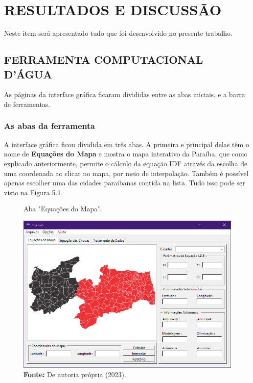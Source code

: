 \chapter{RESULTADOS E DISCUSSÃO}

Neste item será apresentado tudo que foi desenvolvido no presente trabalho.


\section{FERRAMENTA COMPUTACIONAL D'ÁGUA}

As páginas da interface gráfica ficaram divididas entre as abas iniciais, e a barra de ferramentas.

\subsection{As abas da ferramenta}

A interface gráfica ficou dividida em três abas. A primeira e principal delas têm o nome de \textbf{Equações do Mapa} e mostra o mapa interativo da Paraíba, que como explicado anteriormente, permite o cálculo da equação IDF através da escolha de uma coordenada ao clicar no mapa, por meio de interpolação. Também é possível apenas escolher uma das cidades paraibanas contida na lista. Tudo isso pode ser visto na Figura 5.1.\bigskip

\begin{figure}[!ht]
	\centering
	\caption{Aba "Equações do Mapa".}
	\includegraphics[width=.7625\linewidth]{figuras/equacoes_do_mapa.png}
	\caption*{\textbf{Fonte:} De autoria própria (2023).}
	\label{fig:equacoes_do_mapa.png}
\end{figure}

